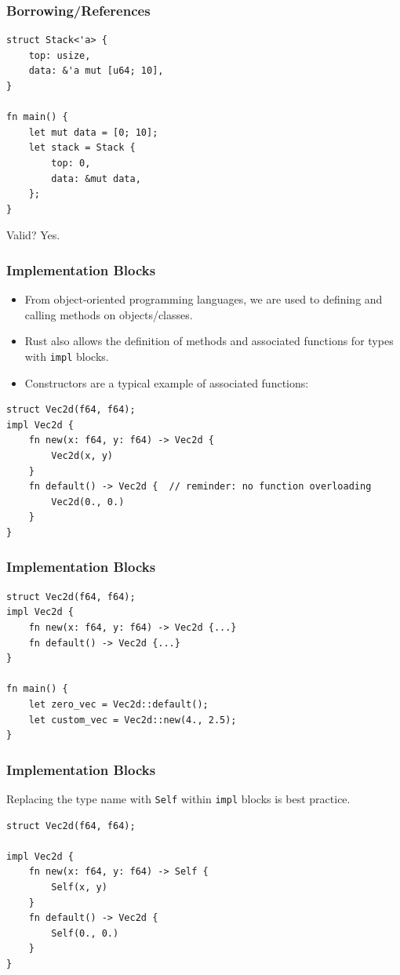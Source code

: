 \begin{frame}[fragile]
    \frametitle{Borrowing/References}
    \begin{verbatim}
struct Stack<'a> {
    top: usize,
    data: &'a mut [u64; 10],
}

fn main() {
    let mut data = [0; 10];
    let stack = Stack {
        top: 0,
        data: &mut data,
    };
}
    \end{verbatim}
    Valid?
    \pause
    \vfill
    Yes.
\end{frame}

\begin{frame}[fragile]
    \frametitle{Implementation Blocks}
    \begin{itemize}
        \item From object-oriented programming languages, we are used to defining and calling methods on objects/classes.
        \item Rust also allows the definition of methods and associated functions for types with \texttt{impl} blocks.
        \pause
        \vspace{.3cm}
        \item Constructors are a typical example of associated functions:
    \end{itemize}
    \pause
    \vfill
    \begin{verbatim}
struct Vec2d(f64, f64);
impl Vec2d {
    fn new(x: f64, y: f64) -> Vec2d {
        Vec2d(x, y)
    }
    fn default() -> Vec2d {  // reminder: no function overloading
        Vec2d(0., 0.)
    }
}
    \end{verbatim}
\end{frame}

\begin{frame}[fragile]
    \frametitle{Implementation Blocks}
    \begin{verbatim}
struct Vec2d(f64, f64);
impl Vec2d {
    fn new(x: f64, y: f64) -> Vec2d {...}
    fn default() -> Vec2d {...}
}

fn main() {
    let zero_vec = Vec2d::default();
    let custom_vec = Vec2d::new(4., 2.5);
}
    \end{verbatim}
\end{frame}

\begin{frame}[fragile]
    \frametitle{Implementation Blocks}
    Replacing the type name with \texttt{Self} within \texttt{impl} blocks is best practice.
    \vfill
    \begin{verbatim}
struct Vec2d(f64, f64);

impl Vec2d {
    fn new(x: f64, y: f64) -> Self {
        Self(x, y)
    }
    fn default() -> Vec2d {
        Self(0., 0.)
    }
}
    \end{verbatim}
\end{frame}


